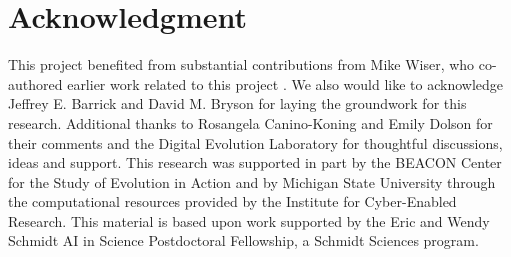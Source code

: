 \section*{Acknowledgment}

This project benefited from substantial contributions from Mike Wiser, who co-authored earlier work related to this project \citep{lalejini2017gene}.
We also would like to acknowledge Jeffrey E. Barrick and David M. Bryson for laying the groundwork for this research.
Additional thanks to Rosangela Canino-Koning and Emily Dolson for their comments and the Digital Evolution Laboratory for thoughtful discussions, ideas and support.
This research was supported in part by the BEACON Center for the Study of Evolution in Action and by Michigan State University through the computational resources provided by the Institute for Cyber-Enabled Research.
This material is based upon work supported by the Eric and Wendy Schmidt AI in Science Postdoctoral Fellowship, a Schmidt Sciences program.
